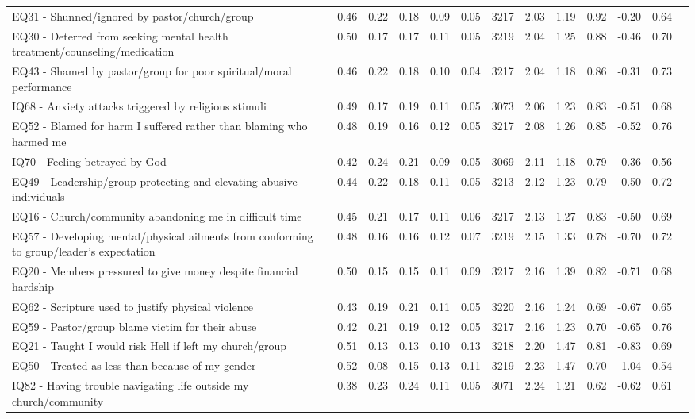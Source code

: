 \documentclass[
  letterpaper,
  DIV=11,
  numbers=noendperiod]{scrreport}
\begin{document}
\begin{longtable}[t]{>{\raggedright\arraybackslash}p{2cm}cccccccccccc}
EQ31 - Shunned/ignored by pastor/church/group & 0.46 & 0.22 & 0.18 & 0.09 & 0.05 & 3217 & 2.03 & 1.19 & 0.92 & -0.20 & 0.64 & \\
\addlinespace
EQ30 - Deterred from seeking mental health treatment/counseling/medication & 0.50 & 0.17 & 0.17 & 0.11 & 0.05 & 3219 & 2.04 & 1.25 & 0.88 & -0.46 & 0.70 & \\
EQ43 - Shamed by pastor/group for poor spiritual/moral performance & 0.46 & 0.22 & 0.18 & 0.10 & 0.04 & 3217 & 2.04 & 1.18 & 0.86 & -0.31 & 0.73 & \\
IQ68 - Anxiety attacks triggered by religious stimuli & 0.49 & 0.17 & 0.19 & 0.11 & 0.05 & 3073 & 2.06 & 1.23 & 0.83 & -0.51 & 0.68 & \\
EQ52 - Blamed for harm I suffered rather than blaming who harmed me & 0.48 & 0.19 & 0.16 & 0.12 & 0.05 & 3217 & 2.08 & 1.26 & 0.85 & -0.52 & 0.76 & \\
IQ70 - Feeling betrayed by God & 0.42 & 0.24 & 0.21 & 0.09 & 0.05 & 3069 & 2.11 & 1.18 & 0.79 & -0.36 & 0.56 & \\
\addlinespace
EQ49 - Leadership/group protecting and elevating abusive individuals & 0.44 & 0.22 & 0.18 & 0.11 & 0.05 & 3213 & 2.12 & 1.23 & 0.79 & -0.50 & 0.72 & \\
EQ16 - Church/community abandoning me in difficult time & 0.45 & 0.21 & 0.17 & 0.11 & 0.06 & 3217 & 2.13 & 1.27 & 0.83 & -0.50 & 0.69 & \\
EQ57 - Developing mental/physical ailments from conforming to group/leader’s expectation & 0.48 & 0.16 & 0.16 & 0.12 & 0.07 & 3219 & 2.15 & 1.33 & 0.78 & -0.70 & 0.72 & \\
EQ20 - Members pressured to give money despite financial hardship & 0.50 & 0.15 & 0.15 & 0.11 & 0.09 & 3217 & 2.16 & 1.39 & 0.82 & -0.71 & 0.68 & \\
EQ62 - Scripture used to justify physical violence & 0.43 & 0.19 & 0.21 & 0.11 & 0.05 & 3220 & 2.16 & 1.24 & 0.69 & -0.67 & 0.65 & \\
\addlinespace
EQ59 - Pastor/group blame victim for their abuse & 0.42 & 0.21 & 0.19 & 0.12 & 0.05 & 3217 & 2.16 & 1.23 & 0.70 & -0.65 & 0.76 & \\
EQ21 - Taught I would risk Hell if left my church/group & 0.51 & 0.13 & 0.13 & 0.10 & 0.13 & 3218 & 2.20 & 1.47 & 0.81 & -0.83 & 0.69 & \\
EQ50 - Treated as less than because of my gender & 0.52 & 0.08 & 0.15 & 0.13 & 0.11 & 3219 & 2.23 & 1.47 & 0.70 & -1.04 & 0.54 & \\
IQ82 - Having trouble navigating life outside my church/community & 0.38 & 0.23 & 0.24 & 0.11 & 0.05 & 3071 & 2.24 & 1.21 & 0.62 & -0.62 & 0.61 & \\

\end{longtable}
\end{document}
